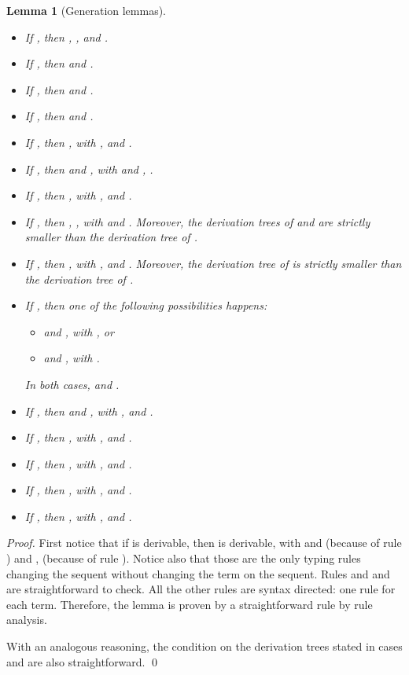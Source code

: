 \documentclass[preprint]{elsarticle}
\newtheorem{lemma}[theorem]{Lemma}
\begin{document}
\begin{lemma}
  [Generation lemmas]~
  \label{lem:generation}
  \begin{itemize}
  \item If , then ,
    , and .
  \item If , then  and
    .
  \item If , then  and
    .
  \item If , then  and
    .
  \item If , then , with
    ,  and
    .
  \item If , then  and
    , with  and
    ,
    .
  \item If , then , with
    ,  and
    .
  \item If , then , , with  and .
    Moreover, the derivation trees of  and 
    are strictly smaller than the derivation tree of .
  \item If , then ,
    with ,  and
    . Moreover, the derivation tree of
     is strictly smaller than the derivation tree of
    .
  \item If , then one of the following possibilities happens:
    \begin{itemize}
    \item  and , with
      , or
    \item  and ,
      with .
    \end{itemize}
    In both cases,  and
    .
  \item If , then  and
    , with ,
     and .
  \item If , then , with
    ,  and
    .
  \item If , then , with
    ,  and
    .
  \item If , then , with
    ,  and
    .
  \item If , then , with
    ,  and
    .
  \end{itemize}
\end{lemma}
\begin{proof}
  First notice that if  is derivable, then 
  is derivable, with  and
   (because of rule ) and , (because of rule ). Notice also that those are the only typing
  rules changing the sequent without changing the term on the sequent. Rules
   and  and are straightforward to check. All
  the other rules are syntax directed: one
  rule for each term. Therefore, the lemma is proven by a straightforward rule
  by rule analysis.

  With an analogous reasoning, the condition on the derivation trees stated in cases
   and  are also straightforward.
  \qed
\end{proof}
\end{document}
